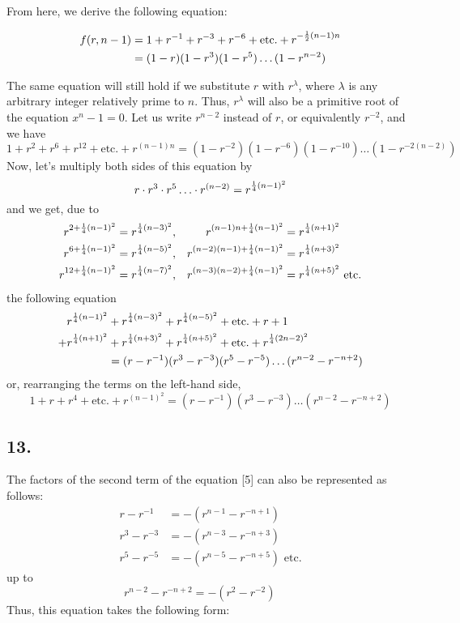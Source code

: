 \documentclass[twoside,12pt, showframe]{memoir}
\let\oldfrac\frac
\def\frac#1#2{\mathchoice{\tfrac{#1}{#2}}{\oldfrac{#1}{#2}}{\genfrac{}{}{}{2}{#1}{#2\mathstrut}}{\genfrac{}{}{}{3}{#1}{#2\mathstrut}}}
\begin{document}
From here, we derive the following equation:

\[
\begin{aligned}
f(r, n-1) & =1+r^{-1}+r^{-3}+r^{-6}+\text{etc.}+r^{-\frac{1}{2}(n-1) n} \\
& =(1-r)(1-r^{3})(1-r^{5}) \ldots(1-r^{n-2})
\end{aligned}
\]
%

The same equation will still hold if we substitute \(r\) with \(r^{\lambda}\), where \(\lambda\) is any arbitrary integer relatively prime to \(n\). Thus, \(r^{\lambda}\) will also be a primitive root of the equation \(x^{n}-1=0\). Let us write \(r^{n-2}\) instead of \(r\), or equivalently \(r^{-2}\), and we have
\[1+r^{2}+r^{6}+r^{12}+\text{etc.}+r^{(n-1) n}=(1-r^{-2})(1-r^{-6})(1-r^{-10}) \ldots(1-r^{-2(n-2)})\]
Now, let's multiply both sides of this equation by
\[r \cdot r^{3} \cdot r^{5} \ldots \cdot r^{(n-2)}=r^{\frac{1}{4}(n-1)^{2}}\]
and we get, due to
\[\begin{alignedat}[t]{4}
r^{2+\frac{1}{4}(n-1)^{2}} & =r^{\frac{1}{4}(n-3)^{2}},\quad & r^{(n-1) n+\frac{1}{4}(n-1)^{2}}&=r^{\frac{1}{4}(n+1)^{2}} \\
r^{6+\frac{1}{4}(n-1)^{2}} & =r^{\frac{1}{4}(n-5)^{2}},\quad & r^{(n-2)(n-1)+\frac{1}{4}(n-1)^{2}}&=r^{\frac{1}{4}(n+3)^{2}} \\
r^{12+\frac{1}{4}(n-1)^{2}} & =r^{\frac{1}{4}(n-7)^{2}},\quad & r^{(n-3)(n-2)+\frac{1}{4}(n-1)^{2}}&=r^{\frac{1}{4}(n+5)^{2}} \text{ etc.}
\end{alignedat}\]
the following equation
\[\begin{aligned}
 r^{\frac{1}{4}(n-1)^{2}}&+r^{\frac{1}{4}(n-3)^{2}}+r^{\frac{1}{4}(n-5)^{2}}+\text{etc.}+r+1 \\
+r^{\frac{1}{4}(n+1)^{2}}&+r^{\frac{1}{4}(n+3)^{2}}+r^{\frac{1}{4}(n+5)^{2}}+\text{etc.}+r^{\frac{1}{4}(2 n-2)^{2}} \\
&=(r-r^{-1})(r^{3}-r^{-3})(r^{5}-r^{-5}) \ldots(r^{n-2}-r^{-n+2})
\end{aligned}\]
or, rearranging the terms on the left-hand side,
\[1+r+r^{4}+\text{etc.}+r^{(n-1)^{2}}=(r-r^{-1})(r^{3}-r^{-3}) \ldots(r^{n-2}-r^{-n+2}) \tag{5}\]
%

\subsection*{13.}

The factors of the second term of the equation [5] can also be represented as follows:
\[\begin{aligned}
r-r^{-1} & =-(r^{n-1}-r^{-n+1}) \\
r^{3}-r^{-3} & =-(r^{n-3}-r^{-n+3}) \\
r^{5}-r^{-5} & =-(r^{n-5}-r^{-n+5}) \text{ etc.}
\end{aligned}\]
up to
\[r^{n-2}-r^{-n+2}=-(r^{2}-r^{-2})\phantom{\text{ etc.}}\]
Thus, this equation takes the following form:
\end{document}
